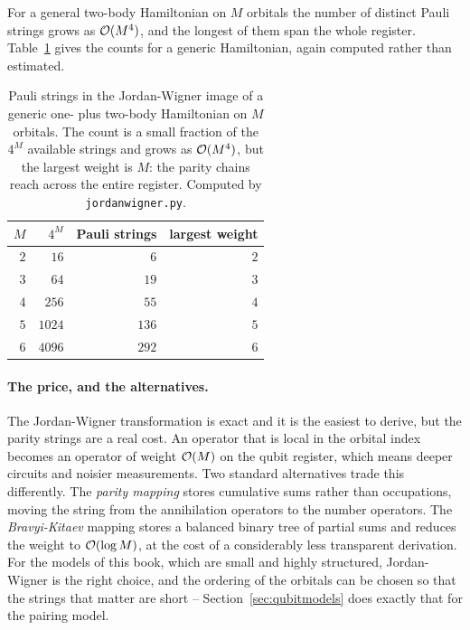 For a general two-body Hamiltonian on $M$ orbitals the number of distinct
Pauli strings grows as $\mathcal{O}(M^4)$, and the longest of them span the whole
register.  Table~\ref{tab:3-paulicount} gives the counts for a generic
Hamiltonian, again computed rather than estimated.

\begin{table}[h]
\centering
\renewcommand{\arraystretch}{1.25}
\setlength{\tabcolsep}{14pt}
\begin{tabular}{rrrr}
\toprule
$M$ & $4^M$ & Pauli strings & largest weight\\
\midrule
$2$ & $16$   & $6$   & $2$\\
$3$ & $64$   & $19$  & $3$\\
$4$ & $256$  & $55$  & $4$\\
$5$ & $1024$ & $136$ & $5$\\
$6$ & $4096$ & $292$ & $6$\\
\bottomrule
\end{tabular}
\caption{Pauli strings in the Jordan-Wigner image of a generic one- plus
two-body Hamiltonian on $M$ orbitals.  The count is a small fraction of the
$4^M$ available strings and grows as $\mathcal{O}(M^4)$, but the largest weight is
$M$: the parity chains reach across the entire register.  Computed by
\texttt{jordanwigner.py}.}
\label{tab:3-paulicount}
\end{table}

\paragraph{The price, and the alternatives.}
The Jordan-Wigner transformation is exact and it is the easiest to derive,
but the parity strings are a real cost.  An operator that is local in the
orbital index becomes an operator of weight $\mathcal{O}(M)$ on the qubit register,
which means deeper circuits and noisier measurements.  Two standard
alternatives trade this differently.  The \emph{parity mapping} stores
cumulative sums rather than occupations, moving the string from the
annihilation operators to the number operators.  The \emph{Bravyi-Kitaev}
mapping stores a balanced binary tree of partial sums and reduces the weight
to $\mathcal{O}(\log M)$, at the cost of a considerably less transparent
derivation.  For the models of this book, which are small and highly
structured, Jordan-Wigner is the right choice, and the ordering of the
orbitals can be chosen so that the strings that matter are short --
Section~\ref{sec:qubitmodels} does exactly that for the pairing model.

